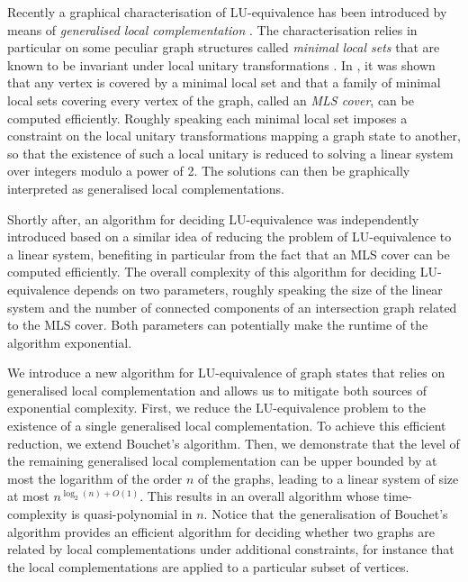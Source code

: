 \documentclass[a4paper,UKenglish,cleveref,autoref,thm-restate]{arxiv}
\begin{document}
Recently a graphical characterisation of LU-equivalence has been introduced by means of \emph{generalised local complementation} \cite{claudet2024local}. The characterisation relies in particular on some peculiar graph structures called \emph{minimal local sets} that are known to be invariant under local unitary transformations \cite{Perdrix06}. In \cite{claudet2024covering}, it was shown that any vertex is covered by a minimal local set and that a family of minimal local sets covering every vertex of the graph, called an \emph{MLS cover}, can be computed efficiently. Roughly speaking each minimal local set imposes a constraint on the local unitary transformations mapping a graph state to another, so that the existence of such a local unitary is reduced to solving a linear system  over integers modulo a power of 2. The solutions can then be graphically interpreted as generalised local complementations. 

Shortly after, an algorithm for deciding LU-equivalence was independently  introduced \cite{burchardt2024algorithmverifylocalequivalence} based on a similar idea of reducing the problem of LU-equivalence to a linear system, benefiting in particular from the fact that an MLS cover can be computed efficiently. The overall complexity of this algorithm for deciding LU-equivalence depends on two parameters, roughly speaking the size of the linear system and the number of connected components of an intersection graph related to the MLS cover. Both parameters can potentially make the runtime of the algorithm exponential. 

We introduce a new algorithm for LU-equivalence of graph states that relies on generalised local complementation and allows us to 
mitigate both sources of exponential complexity. 
First, we reduce the LU-equivalence problem to the existence of a single generalised local complementation. To achieve this efficient reduction, we extend Bouchet's algorithm. Then, we demonstrate that the level of the remaining generalised local complementation can be upper bounded by at most the logarithm of the order $n$ of the graphs, leading to a linear system of size at most $n^{\log_2(n)+O(1)}$. This results in an overall algorithm whose time-complexity is quasi-polynomial in $n$. Notice that the generalisation of Bouchet's algorithm provides an efficient algorithm for deciding whether two graphs are related by local complementations under additional constraints, for instance that the local complementations are applied to a particular subset of vertices.
\end{document}
